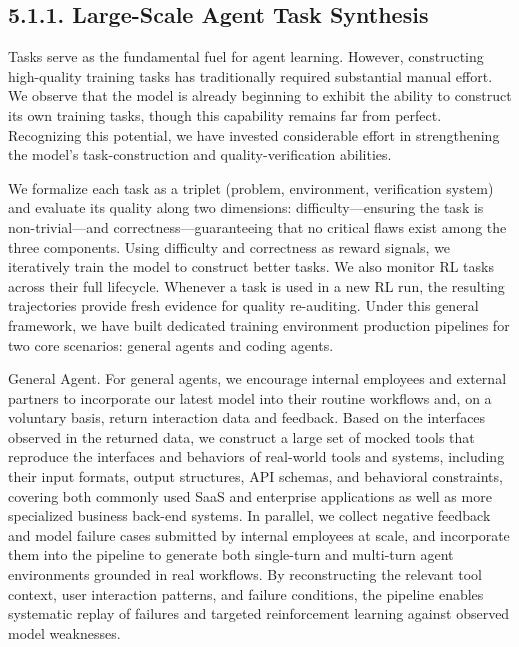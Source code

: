 \documentclass[
  10
]{article}
\begin{document}
\subsection{5.1.1. Large-Scale Agent Task
Synthesis}\label{large-scale-agent-task-synthesis}

Tasks serve as the fundamental fuel for agent learning. However,
constructing high-quality training tasks has traditionally required
substantial manual effort. We observe that the model is already
beginning to exhibit the ability to construct its own training tasks,
though this capability remains far from perfect. Recognizing this
potential, we have invested considerable effort in strengthening the
model's task-construction and quality-verification abilities.

We formalize each task as a triplet (problem, environment, verification
system) and evaluate its quality along two dimensions:
difficulty---ensuring the task is non-trivial---and
correctness---guaranteeing that no critical flaws exist among the three
components. Using difficulty and correctness as reward signals, we
iteratively train the model to construct better tasks. We also monitor
RL tasks across their full lifecycle. Whenever a task is used in a new
RL run, the resulting trajectories provide fresh evidence for quality
re-auditing. Under this general framework, we have built dedicated
training environment production pipelines for two core scenarios:
general agents and coding agents.

General Agent. For general agents, we encourage internal employees and
external partners to incorporate our latest model into their routine
workflows and, on a voluntary basis, return interaction data and
feedback. Based on the interfaces observed in the returned data, we
construct a large set of mocked tools that reproduce the interfaces and
behaviors of real-world tools and systems, including their input
formats, output structures, API schemas, and behavioral constraints,
covering both commonly used SaaS and enterprise applications as well as
more specialized business back-end systems. In parallel, we collect
negative feedback and model failure cases submitted by internal
employees at scale, and incorporate them into the pipeline to generate
both single-turn and multi-turn agent environments grounded in real
workflows. By reconstructing the relevant tool context, user interaction
patterns, and failure conditions, the pipeline enables systematic replay
of failures and targeted reinforcement learning against observed model
weaknesses.
\end{document}
